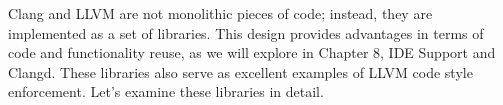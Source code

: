 Clang and LLVM are not monolithic pieces of code; instead, they are implemented as a set of libraries. This design provides advantages in terms of code and functionality reuse, as we will explore in Chapter 8, IDE Support and Clangd. These libraries also serve as excellent examples of LLVM code style enforcement. Let’s examine these libraries in detail.



































































































